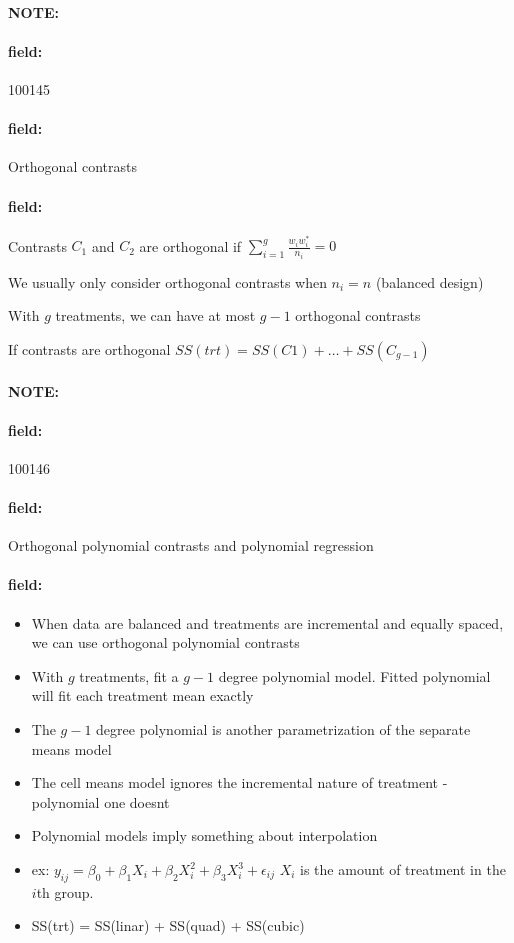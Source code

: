 \documentclass[12pt]{article}
\newenvironment{note}{\paragraph{NOTE:}}{}
\newenvironment{field}{\paragraph{field:}}{}
\begin{document}
\begin{note}
 \begin{field}
  \tiny 100145
 \end{field}
 \begin{field}
  Orthogonal contrasts
 \end{field}
 \begin{field}
  Contrasts $C_1$ and $C_2$ are orthogonal if $\sum_{i=1}^g \frac{w_i w_i^*}{n_i} = 0$

  We usually only consider orthogonal contrasts when $n_i = n$ (balanced design)

  With $g$ treatments, we can have at most $g-1$ orthogonal contrasts

  If contrasts are orthogonal $SS(trt) = SS(C1) + \ldots + SS(C_{g-1})$
 \end{field}
\end{note}


\begin{note}
 \begin{field}
  \tiny 100146
 \end{field}
 \begin{field}
  Orthogonal polynomial contrasts and polynomial regression
 \end{field}
 \begin{field}
  \begin{itemize}
   \item When data are balanced and treatments are incremental and equally spaced, we can use orthogonal polynomial contrasts
   \item With $g$ treatments, fit a $g-1$ degree polynomial model. Fitted polynomial will fit each treatment mean exactly
   \item The $g-1$ degree polynomial is another parametrization of the separate means model
   \item The cell means model ignores the incremental nature of treatment - polynomial one doesnt
   \item Polynomial models imply something about interpolation
   \item ex: $y_{ij}  = \beta_0 + \beta_1 X_i + \beta_2 X_i^2 + \beta_3 X_i^3 + \epsilon_{ij}$ $X_i$ is the amount of treatment in the $i$th group.
   \item SS(trt) = SS(linar) + SS(quad) + SS(cubic)
  \end{itemize}
 \end{field}
\end{note}
\end{document}
